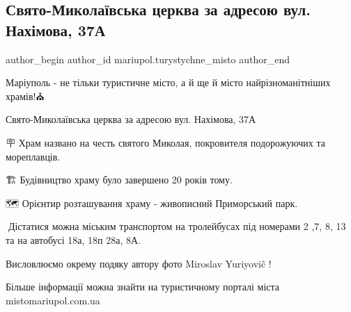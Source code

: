  
 
 
 
 

\subsection{Свято-Миколаївська церква за адресою вул. Нахімова, 37А}
\label{sec:24_11_2021.fb.mariupol.turystychne_misto.1.svjato_mykolaivska_cervka_nahimova_37a}

\ifcmt
 author_begin
   author_id mariupol.turystychne_misto
 author_end
\fi

Маріуполь - не тільки туристичне місто, а й ще й місто найрізноманітніших
храмів!⛪

Свято-Миколаївська церква за адресою вул. Нахімова, 37А

🪧 Храм названо на честь святого Миколая, покровителя подорожуючих та
мореплавців.

🏗 Будівництво храму було завершено 20 років тому.

🗺 Орієнтир розташування храму - живописний Приморський парк.

👣Дістатися можна міським транспортом на тролейбусах під номерами 2 ,7, 8, 13
та на автобусі 18а, 18п 28а, 8А.

Висловлюємо окрему подяку автору фото Miroslav Yuriyoviĉ !

Більше інформації можна знайти на туристичному порталі міста
mistomariupol.com.ua
